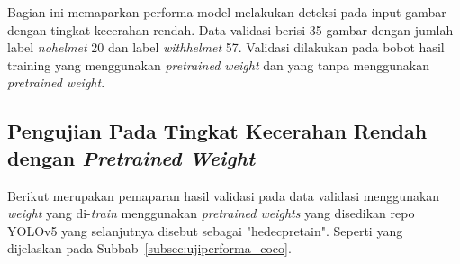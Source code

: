 \par Bagian ini memaparkan performa model melakukan
deteksi pada input gambar dengan tingkat kecerahan rendah. Data validasi berisi
35 gambar dengan jumlah label \emph{no\textunderscore helmet} 20 dan label \emph{with\textunderscore helmet} 57.
Validasi dilakukan pada bobot hasil training yang menggunakan \textit{pretrained weight} dan yang tanpa menggunakan \textit{pretrained weight}. 

\subsection{Pengujian Pada Tingkat Kecerahan Rendah dengan \emph{Pretrained Weight}}
\label{subsec:lowlight_pretrained}

\par Berikut merupakan pemaparan hasil validasi pada data validasi menggunakan \emph{weight} yang di-\emph{train} menggunakan
\emph{pretrained weights} yang disedikan repo YOLOv5 yang selanjutnya disebut sebagai "hedec\textunderscore pretain". 
Seperti yang dijelaskan pada Subbab~\ref{subsec:ujiperforma_coco}. 


